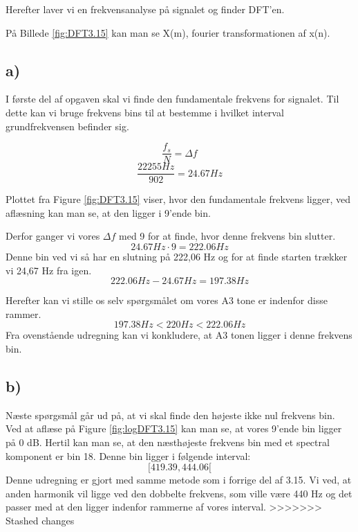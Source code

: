 \documentclass[../main.tex]{subfiles}
\begin{document}
Herefter laver vi en frekvensanalyse på signalet og finder DFT'en.

På Billede \ref{fig:DFT3.15} kan man se X(m), fourier transformationen af x(n).

\subsection{a)}
I første del af opgaven skal vi finde den fundamentale frekvens for signalet.
Til dette kan vi bruge frekvens bins til at bestemme i hvilket interval grundfrekvensen befinder sig.

\[
    \frac{f_s}{N} = \Delta f
\]
\[
    \frac{22255 Hz}{902} = 24.67 Hz
\]

Plottet fra Figure \ref{fig:DFT3.15} viser, hvor den fundamentale frekvens ligger, ved aflæsning kan man se, at den ligger i 9'ende bin.

Derfor ganger vi vores $\Delta f$ med 9 for at finde, hvor denne frekvens bin slutter.
\[
    24.67 Hz \cdot 9 = 222.06 Hz
\]
Denne bin ved vi så har en slutning på 222,06 Hz og for at finde starten trækker vi 24,67 Hz fra igen.
\[
    222.06 Hz - 24.67 Hz = 197.38 Hz
\]

Herefter kan vi stille os selv spørgsmålet om vores A3 tone er indenfor disse rammer.
\[
    197.38 Hz < 220 Hz < 222.06 Hz
\]
Fra ovenstående udregning kan vi konkludere, at A3 tonen ligger i denne frekvens bin.

\subsection{b)}
Næste spørgsmål går ud på, at vi skal finde den højeste ikke nul frekvens bin.
Ved at aflæse på Figure \ref{fig:logDFT3.15} kan man se, at vores 9'ende bin ligger på 0 dB. Hertil kan man se, at den næsthøjeste
frekvens bin med et spectral komponent er bin 18. Denne bin ligger i følgende interval: 
\[[419.39 , 444.06[\] 
Denne udregning er gjort med samme metode som i forrige del af 3.15.
Vi ved, at anden harmonik vil ligge ved den dobbelte frekvens, som ville være 440 Hz og det passer med at den ligger indenfor rammerne af vores interval.
>>>>>>> Stashed changes
\end{document}
